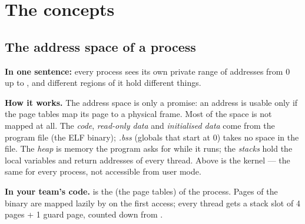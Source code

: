 \documentclass[11pt]{report}
\newcommand{\conceptsection}[1]{\section{#1}}
\newcommand{\inteam}{\par\smallskip\noindent\textbf{In your team's code.} }
\begin{document}
\chapter*{The concepts}

\conceptsection{The address space of a process}
\label{c:address-space}

\textbf{In one sentence:} every process sees its own private range of addresses from 0 up to
, and different regions of it hold different things.

\begin{center}
\end{center}

\textbf{How it works.} The address space is only a promise: an address is usable only if the page
tables map its page to a physical frame. Most of the space is not mapped at all. The
\emph{code}, \emph{read-only data} and \emph{initialised data} come from the program file (the ELF
binary); \emph{.bss} (globals that start at 0) takes no space in the file. The \emph{heap} is memory
the program asks for while it runs; the \emph{stacks} hold the local variables and return addresses
of every thread. Above  is the kernel --- the same for every process, not
accessible from user mode.

\inteam {} is the  (the page tables) of the
process. Pages of the binary are mapped lazily by  on the first access; every
thread gets a stack slot of 4 pages + 1 guard page, counted down from .
\end{document}

